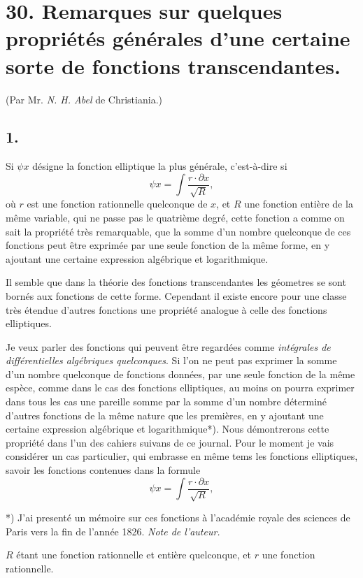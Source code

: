 \documentclass{article}
\begin{document}
\section*{30. Remarques sur quelques propriétés générales d'une certaine sorte de fonctions transcendantes.}

(Par Mr. \emph{N. H. Abel} de Christiania.)

\subsection*{1.}

Si $\psi x$ désigne la fonction elliptique la plus générale, c'est-à-dire si
\[ \psi x = \int \frac{r \cdot \partial x}{\sqrt{R}}, \]
où $r$ est une fonction rationnelle quelconque de $x$, et $R$ une fonction entière de la même variable, qui ne passe pas le quatrième degré, cette fonction a comme on sait la propriété très remarquable, que la somme d'un nombre quelconque de ces fonctions peut être exprimée par une seule fonction de la même forme, en y ajoutant une certaine expression algébrique et logarithmique.

Il semble que dans la théorie des fonctions transcendantes les géometres se sont bornés aux fonctions de cette forme. Cependant il existe encore pour une classe très étendue d'autres fonctions une propriété analogue à celle des fonctions elliptiques.

Je veux parler des fonctions qui peuvent être regardées comme \emph{intégrales de différentielles algébriques quelconques}. Si l'on ne peut pas exprimer la somme d'un nombre quelconque de fonctions données, par une seule fonction de la même espèce, comme dans le cas des fonctions elliptiques, au moins on pourra exprimer dans tous les cas une pareille somme par la somme d'un nombre déterminé d'autres fonctions de la même nature que les premières, en y ajoutant une certaine expression algébrique et logarithmique*). Nous démontrerons cette propriété dans l'un des cahiers suivans de ce journal. Pour le moment je vais considérer un cas particulier, qui embrasse en même tems les fonctions elliptiques, savoir les fonctions contenues dans la formule
\[ \psi x = \int \frac{r \cdot \partial x}{\sqrt{R}}, \tag{1} \]

*) J'ai presenté un mémoire sur ces fonctions à l'académie royale des sciences de Paris vers la fin de l'année 1826. \emph{Note de l'auteur.}

$R$ étant une fonction rationnelle et entière quelconque, et $r$ une fonction rationnelle.
\end{document}
